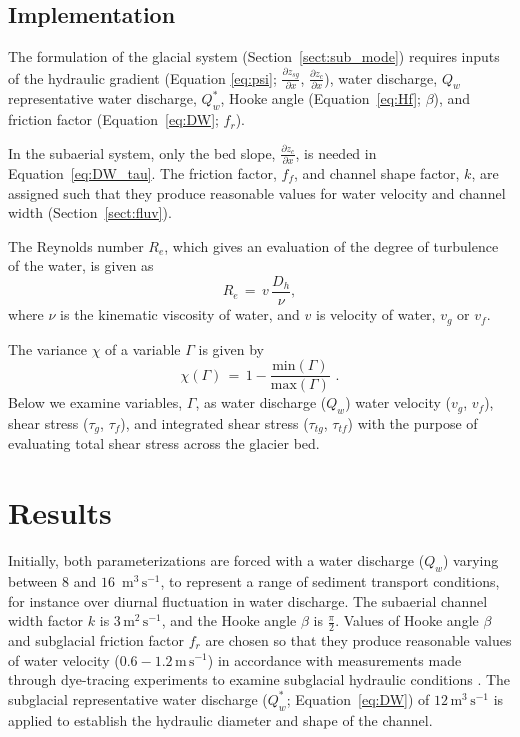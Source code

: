 \documentclass[11pt]{article}
\newcommand{\unit}[1]{$\mathrm{#1}$}
\begin{document}
\begin{spacing}{1}
  \subsection{Implementation}
  
  The formulation of the glacial system (Section~\ref{sect:sub_mode}) requires inputs of the hydraulic gradient (Equation \ref{eq:psi}; $\frac{\partial z_{sg}}{\partial x}$, $\frac{\partial z_{c}}{\partial x}$), water discharge, $Q_w$ representative water discharge, $Q_w^*$,  Hooke angle (Equation~\ref{eq:Hf}; $\beta$), and friction factor (Equation~\ref{eq:DW}; $f_r$).

  
  In the subaerial system,  only the bed slope, $\frac{\partial z_c}{\partial x}$, is needed in Equation~\ref{eq:DW_tau}. The friction factor, $f_f$, and channel shape factor, $k$, are assigned such that they produce reasonable values for water velocity and channel width  (Section~\ref{sect:fluv}).
  
  The Reynolds number $R_e$, which gives an evaluation of the degree of turbulence of the water, is given as 
  \begin{equation}
    \label{eq:re}
    R_e\,=\, v \,\frac{D_h}{\nu},
  \end{equation}
  \noindent where $\nu$ is the kinematic viscosity of water, and  $v$ is velocity of water, $v_g$ or $v_f$.
  
  The variance $ \chi$ of a variable $\Gamma$ is given by 
  \begin{equation}
    \label{eq:var}
    \chi(\Gamma) \,=\, 1 - \frac{\mathrm{min}(\Gamma)}{\mathrm{max}(\Gamma)}\,\,.
  \end{equation}
  \noindent Below we examine variables, $\Gamma$, as water discharge ($Q_w$) water velocity ($v_g$, $v_f$), shear stress ($\tau_g$, $\tau_f$), and integrated shear stress ($\tau_{tg}$, $\tau_{tf}$) with the purpose of evaluating total shear stress across the glacier bed.
  
  
  \section{Results}
  Initially, both parameterizations are forced with a water discharge ($Q_w$) varying between $8$ and $16$ \,\unit{m}$^{3}$\,\unit{s}$^{-1}$, to represent a range of sediment transport conditions, for instance over diurnal fluctuation in water discharge. The subaerial channel width factor $k$ is $3$\,\unit{m}$^{2}$\,\unit{s}$^{-1}$, and the Hooke angle $\beta$ is $\frac{\pi}{2}$.
  Values of Hooke angle $\beta$ and subglacial friction factor $f_r$ are chosen so that they produce reasonable values of water velocity ($0.6- 1.2$\,\unit{m}\,\unit{s}$^{-1}$) in accordance with measurements made through dye-tracing experiments to examine subglacial hydraulic conditions \citep[Section~\ref{sect:sub_mode}, Figure~\ref{fig:model_outs}; e.g.][]{werder2010}.
  The subglacial representative water discharge ($Q_w^*$; Equation~\ref{eq:DW}) of $12$\,\unit{m}$^{3}$\,\unit{s}$^{-1}$ is applied to establish the hydraulic diameter and shape of the channel.
  

\end{spacing}
\end{document}
